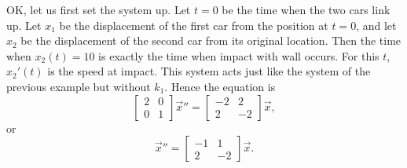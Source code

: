 \documentclass{ximera}
\begin{document}
\begin{exampleSol}
    OK\@, let us first set the system up.  Let $t=0$ be the time when the two cars link up.  Let $x_1$ be the displacement of the first car from the position at $t=0$, and let $x_2$ be the displacement of the second car from its original location.  Then the time when $x_2(t) = 10$ is exactly the time when impact with wall occurs. For this $t$, $x_2'(t)$ is the speed at impact.  This system acts just like the system of the previous example but without $k_1$.  Hence the equation is
    \begin{equation*}
        \begin{bmatrix}
            2 & 0 \\
            0 & 1
        \end{bmatrix}
        {\vec{x}}'' =
        \begin{bmatrix}
            -2 & 2 \\
            2 & -2
        \end{bmatrix}
        \vec{x} ,
    \end{equation*}
    or
    \begin{equation*}
        {\vec{x}}'' =
        \begin{bmatrix}
            -1 & 1 \\
            2 & -2
        \end{bmatrix}
        \vec{x} .
    \end{equation*}
    

\end{exampleSol}
\end{document}

